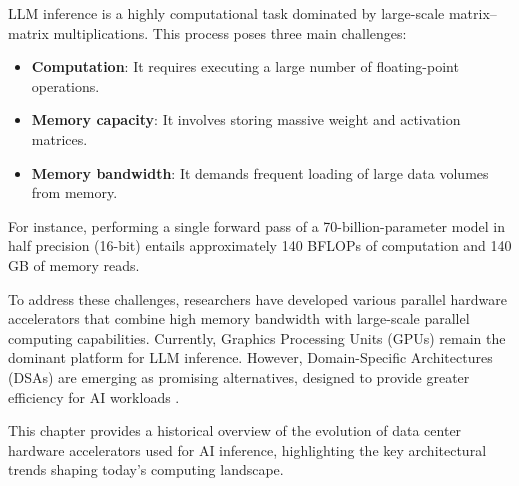 LLM inference is a highly computational task dominated by large-scale matrix–matrix multiplications. This process poses three main challenges:
\begin{itemize}
    \item \textbf{Computation}: It requires executing a large number of floating-point operations.
    \item \textbf{Memory capacity}: It involves storing massive weight and activation matrices.
    \item \textbf{Memory bandwidth}: It demands frequent loading of large data volumes from memory.

\end{itemize}
For instance, performing a single forward pass of a 70-billion-parameter model in half precision (16-bit) entails approximately 140 BFLOPs of computation and 140 GB of memory reads.

To address these challenges, researchers have developed various parallel hardware accelerators that combine high memory bandwidth with large-scale parallel computing capabilities. Currently, Graphics Processing Units (GPUs) remain the dominant platform for LLM inference. However, Domain-Specific Architectures (DSAs) are emerging as promising alternatives, designed to provide greater efficiency for AI workloads \cite{chen2020survey, koilia2024hardware, silvano2025survey, kachris2025survey}.

This chapter provides a historical overview of the evolution of data center hardware accelerators used for AI inference, highlighting the key architectural trends shaping today’s computing landscape.
